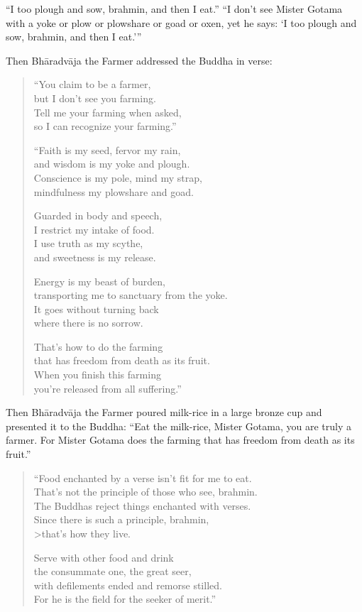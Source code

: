 \documentclass[12pt,openany]{book}%
\begin{document}
“I too plough and sow, brahmin, and then I eat.” “I don’t see Mister Gotama with a yoke or plow or plowshare or goad or oxen, yet he says: ‘I too plough and sow, brahmin, and then I eat.’” 

Then \textsanskrit{Bhāradvāja} the Farmer addressed the Buddha in verse: 

\begin{verse}%
“You claim to be a farmer, \\
but I don’t see you farming. \\
Tell me your farming when asked, \\
so I can recognize your farming.” 

“Faith is my seed, fervor my rain, \\
and wisdom is my yoke and plough. \\
Conscience is my pole, mind my strap, \\
mindfulness my plowshare and goad. 

Guarded in body and speech, \\
I restrict my intake of food. \\
I use truth as my scythe, \\
and sweetness is my release. 

Energy is my beast of burden, \\
transporting me to sanctuary from the yoke. \\
It goes without turning back \\
where there is no sorrow. 

That’s how to do the farming \\
that has freedom from death as its fruit. \\
When you finish this farming \\
you’re released from all suffering.” 

%
\end{verse}

Then \textsanskrit{Bhāradvāja} the Farmer poured milk-rice in a large bronze cup and presented it to the Buddha: “Eat the milk-rice, Mister Gotama, you are truly a farmer. For Mister Gotama does the farming that has freedom from death as its fruit.” 

\begin{verse}%
“Food enchanted by a verse isn’t fit for me to eat. \\
That’s not the principle of those who see, brahmin. \\
The Buddhas reject things enchanted with verses. \\
Since there is such a principle, brahmin, \\>that’s how they live. 

Serve with other food and drink \\
the consummate one, the great seer, \\
with defilements ended and remorse stilled. \\
For he is the field for the seeker of merit.” 

%
\end{verse}
\end{document}
